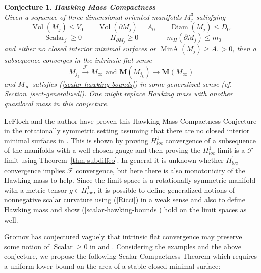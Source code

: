 \documentclass[12pt]{amsart}
\newtheorem{conj}[thm]{Conjecture}
\begin{document}
\begin{conj}\label{Hawking-Compactness}{\em \bf Hawking Mass Compactness}\\
Given a sequence of 
three dimensional oriented manifolds $M_j^3$ satisfying 
\begin{equation}
 {\operatorname{Vol}}(M_j) \le V_0\qquad 
{\operatorname{Vol}}(\partial M_j) = A_0 
\qquad {\operatorname{Diam}}(M_j) \le D_0.
\end{equation}
\begin{equation}\label{scalar-hawking-bounds}
\qquad\,\, {\operatorname{Scalar}}_j \ge 0 \qquad \qquad H_{\partial M_j} \ge 0 \qquad
\qquad m_H(\partial M_j)\le m_0 \qquad
\end{equation}
and either no closed interior minimal surfaces or ${\operatorname{MinA}}(M_j) \ge A_1>0$,
then a subsequence converges in the intrinsic flat sense
\begin{equation}
M_{j_k} {\stackrel {\mathcal{F}}{\longrightarrow} } M_\infty \textrm{ and } {{\mathbf M}}(M_{j_k}) \to {{\mathbf M}}(M_\infty)
\end{equation}
and $M_\infty$ satisfies (\ref{scalar-hawking-bounds})
in some generalized sense (cf. Section~\ref{sect-generalized}).
One might replace Hawking mass with another quasilocal mass in this conjecture.
\end{conj}

LeFloch and the author have proven this 
Hawking Mass Compactness Conjecture in the rotationally
symmetric setting assuming that there are no closed interior minimal
surfaces in \cite{LeFloch-Sormani-1}.  This is shown by proving $H^1_{loc}$
convergence of a subsequence of the manifolds with a well chosen
gauge and then proving the $H^1_{loc}$ limit is a $\mathcal{F}$ limit
using Theorem~\ref{thm-subdiffeo}.
In general it is unknown whether $H^1_{loc}$ convergence implies
$\mathcal{F}$ convergence, but here there is also monotonicity of the
Hawking mass to help.   Since the limit space is a rotationally symmetric
manifold with a metric tensor $g \in H^1_{loc}$, it is possible to define
generalized notions of nonnegative scalar curvature using (\ref{Ricci})
in a weak sense and also to define Hawking mass and show 
(\ref{scalar-hawking-bounds}) hold on the limit spaces as well.   

Gromov has conjectured vaguely that intrinsic flat convergence
may preserve some notion of ${\operatorname{Scalar}} \ge 0$ in \cite{Gromov-Plateau} and
\cite{Gromov-Dirac}.   Considering the
examples and the above conjecture, we propose the following Scalar
Compactness Theorem which requires a uniform lower bound on
the area of a stable closed minimal surface: 
 
\end{document}

